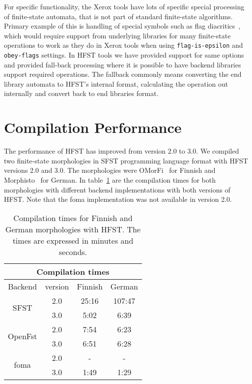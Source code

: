 \documentclass{llncs}
\begin{document}
For specific functionality, the Xerox tools have lots of specific special
processing of finite-state automata, that is not part of standard finite-state
algorithms. Primary example of this is handling of special symbols such as
flag diacritics~\cite{beesley/1998}, which would require support from underlying
libraries for many finite-state operations to work as they do in Xerox tools
when using \texttt{flag-is-epsilon} and \texttt{obey-flags} settings. In
HFST tools we have provided support for same options and provided fall-back
processing where it is possible to have backend libraries support required
operations. The fallback commonly means converting the end library
automata to HFST's internal format, calculating the operation out internally
and convert back to end libraries format. 

\section{Compilation Performance}

The performance of HFST has improved from version 2.0 to 3.0. 
We compiled two finite-state morphologies in SFST programming language format
with HFST versions 2.0 and 3.0. 
The morphologies were OMorFi~\cite{pirinen/2008} for Finnish and 
Morphisto~\cite{zielinski/2009} for German.
In table~\ref{tab:compilation_times} are the compilation times 
for both morphologies with 
different backend implementations with both versions of HFST. 
Note that the foma implementation was not available in version 2.0.

\begin{table}
\centering
  \begin{tabular}{ c | c | c | c }
  \multicolumn{4}{c}{Compilation times} \\ \hline
  Backend & version & Finnish & German \\ \hline
  \multirow{2}{*}{SFST} & 2.0 & 25:16 & 107:47 \\
  & 3.0 & 5:02 & 6:39 \\ \hline
  \multirow{2}{*}{OpenFst} & 2.0 & 7:54 & 6:23 \\
  & 3.0 & 6:51 & 6:28 \\ \hline
  \multirow{2}{*}{foma} & 2.0 & - & - \\
  & 3.0 & 1:49 & 1:29 \\
  \end{tabular}
  \caption{Compilation times for Finnish and German morphologies with
    HFST. The times are expressed in minutes and seconds.}
  \label{tab:compilation_times}
\end{table}
\end{document}
